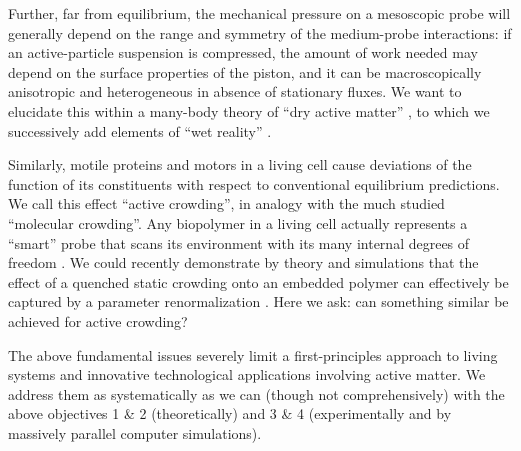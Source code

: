 \begin{workpackage}[id=WPactive,wphases=0-48,
  short=Active Particle Suspensions,%
  title=Probing active particle suspensions with colloids and polymers,
  lead=ULEI,
  ULEIRM=96,UNIPDRM=6,USTUTTRM=2]
\begin{wpdescription}
Further, far from equilibrium, the mechanical pressure on a mesoscopic probe will generally depend on the range and 
symmetry of the medium-probe interactions: if an active-particle suspension is compressed, the
amount of work needed may depend on the surface properties of the piston, and it can be macroscopically
anisotropic and heterogeneous in absence of stationary fluxes. 
%
We want to elucidate this within a many-body theory of ``dry active matter'' \cite{marchetti-etal:2013}, 
to which we successively add elements of ``wet reality'' \cite{zoettl-stark:2014}.

Similarly, motile proteins and motors in a living cell cause deviations of the function
of its constituents with respect to conventional equilibrium predictions.  We call this
effect ``active crowding'', in analogy with the much studied ``molecular crowding''. 
%
Any biopolymer in a living cell actually represents a ``smart'' probe that scans its environment with its many 
internal degrees of freedom \cite{otto-etal:2013}.
%
We could recently demonstrate by theory and simulations that the effect of a quenched static crowding onto an embedded
polymer can effectively be captured by a parameter renormalization \cite{schoebl-etal:2014}.  
%
Here we ask: can something similar be achieved for active crowding?

The above fundamental issues severely limit a first-principles approach to living systems and
innovative technological applications involving active matter.
%
We address them as systematically as we can (though not comprehensively) with the above
objectives 1 \& 2 (theoretically) and 3 \& 4 (experimentally and by massively parallel
computer simulations).

\end{wpdescription}

\begin{tasklist}


\end{tasklist}
\end{workpackage}
